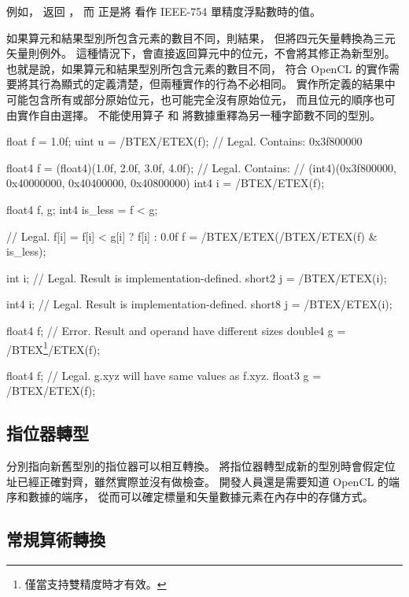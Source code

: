 例如，  返回 ，
而  正是將  看作 IEEE-754 單精度浮點數時的值。

如果算元和結果型別所包含元素的數目不同，則結果，
但將四元矢量轉換為三元矢量則例外。
這種情況下，會直接返回算元中的位元，不會將其修正為新型別。
也就是說，如果算元和結果型別所包含元素的數目不同，
符合 OpenCL 的實作需要將其行為顯式的定義清楚，但兩種實作的行為不必相同。
實作所定義的結果中可能包含所有或部分原始位元，也可能完全沒有原始位元，
而且位元的順序也可由實作自由選擇。
不能使用算子  和  將數據重釋為另一種字節數不同的型別。

\startexample
\startclc
float f = 1.0f;
uint u = /BTEX/ETEX(f);	// Legal. Contains:	0x3f800000

float4 f = (float4)(1.0f, 2.0f, 3.0f, 4.0f);
// Legal. Contains:
// (int4)(0x3f800000, 0x40000000, 0x40400000, 0x40800000)
int4 i = /BTEX/ETEX(f);

float4 f, g;
int4 is_less = f < g;

// Legal. f[i] = f[i] < g[i] ? f[i] : 0.0f
f = /BTEX/ETEX(/BTEX/ETEX(f) & is_less);

int i;
// Legal. Result is implementation-defined.
short2 j = /BTEX/ETEX(i);

int4 i;
// Legal. Result is implementation-defined.
short8 j = /BTEX/ETEX(i);

float4 f;
// Error. Result and operand have different sizes
double4 g = /BTEX\footnote{僅當支持雙精度時才有效。}/ETEX(f);

float4 f;
// Legal. g.xyz will have same values as f.xyz.
float3 g = /BTEX/ETEX(f);
\stopclc
\stopexample

\subsection{指位器轉型}

分別指向新舊型別的指位器可以相互轉換。
將指位器轉型成新的型別時會假定位址已經正確對齊，雖然實際並沒有做檢查。
開發人員還是需要知道 OpenCL 的端序和數據的端序，
從而可以確定標量和矢量數據元素在內存中的存儲方式。

\subsection[sec:usualArithConv]{常規算術轉換}

